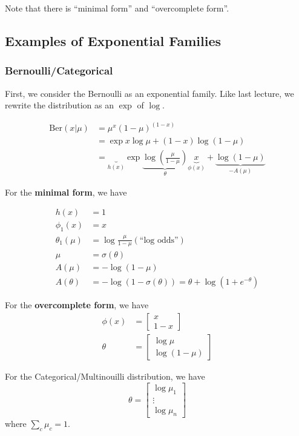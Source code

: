 \documentclass{article}
\begin{document}
\noindent Note that there is ``minimal form'' and ``overcomplete form''.

\subsection{Examples of Exponential Families}

\subsubsection{Bernoulli/Categorical}
First, we consider the Bernoulli as an exponential family. Like last lecture, we rewrite the distribution as an $\exp$ of $\log$.

\begin{align*}    
\text{Ber}(x | \mu) &= \mu^x(1-\mu)^{(1-x)} \\
 &= \exp{x\log \mu + (1-x)\log(1-\mu)} \\
 &= \underbrace{}_{h(x)}\exp{ \underbrace{\log\left(\frac{\mu }{1- \mu}\right)}_{\theta} \underbrace{x}_{\phi(x)} + \underbrace{\log (1- \mu)}_{-A(\mu)}}
\end{align*}

For the \textbf{minimal form}, we have 

\begin{align*}
    h(x) &= 1 \\
    \phi_1(x) &= x \\
    \theta_1(\mu) &= \log\frac{\mu}{1 - \mu} (\text{``log odds''}) \\
    \mu &= \sigma(\theta)\\
    A(\mu) &= -\log(1-\mu)\\
    A(\theta) &= -\log(1-\sigma(\theta)) = \theta + \log(1+ e^{-\theta})
\end{align*}

For the \textbf{overcomplete form}, we have 
\begin{align*}
    \phi(x) &= \begin{bmatrix} x \\ 1 - x \end{bmatrix}\\
    \theta &= \begin{bmatrix} \log \mu \\ \log (1- \mu) \end{bmatrix}
\end{align*}

For the Categorical/Multinouilli distribution, we have
$$\theta = \begin{bmatrix}
\log \mu_1 \\
\vdots \\
\log \mu_n
\end{bmatrix}
$$
where $\sum_{c} \mu_c = 1$.
\end{document}
